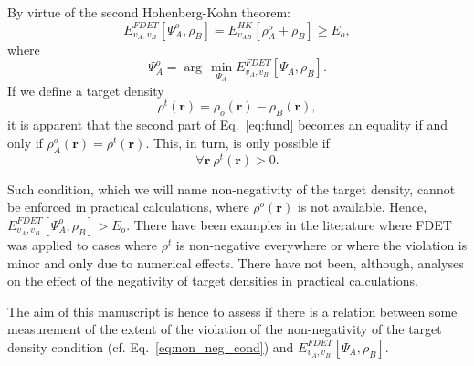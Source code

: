 \documentclass[journal=jctcce,manuscript=article, layout=twocolumn]{achemso}
\begin{document}
By virtue of the second Hohenberg-Kohn theorem:
\begin{equation}\label{eq:fund}
 E_{v_A,v_B}^{FDET}[\Psi^{o}_{A},\rho_B] =  E_{v_{AB}}^{HK}[\rho_A^{o}+\rho_B] \ge E_o,
\end{equation}
where
\begin{equation} \label{eq:Psi_o}
 \Psi^{o}_{A} = \arg \, \min \limits_{\Psi_A} E_{v_A,v_B}^{FDET}[\Psi_{A},\rho_B].
\end{equation}
If we define a target density
\begin{equation}\label{eq:target}
 \rho^t(\mathbf{r}) = \rho_o(\mathbf{r}) - \rho_B(\mathbf{r}),
\end{equation}
it is apparent that the second part of Eq.~\ref{eq:fund} becomes an equality if and only if $\rho_A^{o}(\mathbf{r}) = \rho^t(\mathbf{r})$. This, in turn, is only possible if
\begin{equation}\label{eq:non_neg_cond}
\forall \mathbf{r} \ \rho^t(\mathbf{r}) > 0. 
\end{equation}

Such condition, which we will name non-negativity of the target density, cannot be enforced in practical calculations, where $\rho^o(\mathbf{r})$ is not available. Hence, $E_{v_A,v_B}^{FDET}[\Psi^{o}_{A},\rho_B] > E_o$. There have been examples in the literature where FDET was applied to cases where $\rho^t$ is non-negative everywhere\cite{Wesolowski2013} or where the violation is minor and only due to numerical effects\cite{Fux2010}. There have not been, although, analyses on the effect of the negativity of target densities in practical calculations.

The aim of this manuscript is hence to assess if there is a relation between some measurement of the extent of the violation of the non-negativity of the target density condition (cf. Eq.~\ref{eq:non_neg_cond}) and ${E}_{v_A,v_B}^{FDET}[\Psi_{A},\rho_B]$.
\end{document}
